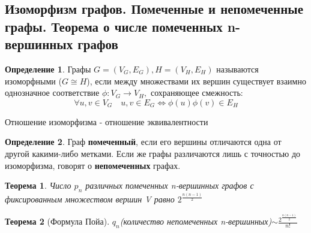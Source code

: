 \documentclass[a4paper]{article}
\newtheorem{theorem}{Теорема}[section]
\theoremstyle{definition}
\newtheorem*{definition}{Определение}
\theoremstyle{remark}
\begin{document}
\begin{multicols*}{2}
    \section{Изоморфизм графов. Помеченные и непомеченные графы. Теорема о числе помеченных 
    n-вершинных графов}
    \begin{definition}
        Графы $G = (V_G, E_G), H = (V_H, E_H)$ называются изоморфными ($G\cong H$), если между множествами их вершин существует взаимно однозначное соответствие $\phi: V_G \to V_H,$ сохраняющее смежность:
        $$\forall u, v\in V_G\quad u, v\in E_G \Leftrightarrow \phi(u)\phi(v)\in E_H$$
    \end{definition}
    Отношение изоморфизма - отношение эквивалентности 
    \begin{definition}
        Граф \textbf{помеченный}, если его вершины отличаются одна от другой какими-либо метками. Если же графы различаются лишь с точностью до изоморфизма, говорят о \textbf{непомеченных} графах.
    \end{definition}
    \begin{theorem}
        Число $p_n$ различных помеченных n-вершинных графов с фиксированным множеством вершин V равно $2^{\frac{n(n-1)}{2}}$
    \end{theorem}
    \begin{theorem}[Формула Пойа]
        $q_n$(количество непомеченных n-вершинных)$ \sim \frac{2^{\frac{n(n-1)}{2}}}{n!}$
    \end{theorem}

\end{multicols*}
\end{document}
